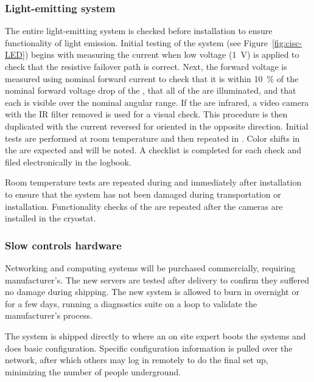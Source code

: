 \subsubsection{Light-emitting system}
\label{sec:fdgen-slow-cryo-qc-les}

The entire light-emitting system is checked before installation to ensure functionality of light emission. 
Initial testing of the system (see Figure~\ref{fig:cisc-LED}) begins with
measuring the current when low voltage (\SI{1}{V}) is applied to check
that the resistive  failover path is correct. Next, the forward voltage is measured using nominal forward current to
check that it is within \SI{10}{\%} of the nominal forward voltage drop of
the , that all of the  are illuminated, and that each  is visible over the nominal angular range. If the  are
infrared, a video camera with the IR filter removed is used for a
visual check. This procedure is then duplicated with the current
reversed for  oriented in the opposite direction. Initial tests are performed at room temperature and then repeated in . 
Color shifts in the  are expected and will be noted. A checklist is completed for each  check and filed electronically in the  logbook.

Room temperature tests are repeated during and immediately after installation to ensure that the system has not been damaged during transportation or installation. Functionality checks of the  are repeated after the cameras are installed in the cryostat.

\subsubsection{Slow controls hardware}
\label{sec:fdsp-slow-cryo-qc-sc-hard}

Networking and computing systems will be purchased commercially, requiring manufacturer's. The new servers %
are tested after delivery to confirm they suffered no damage during shipping. The new system is allowed to burn in overnight or for a few days, 
running a diagnostics suite on a loop to validate %
the manufacturer's  process.

The system %
is shipped directly to \surf
where an on site
expert %
boots the systems and does basic
configuration. %
Specific configuration information %
is pulled over
the network, after which others may log in remotely to do the final
set up, minimizing the number of people underground.


